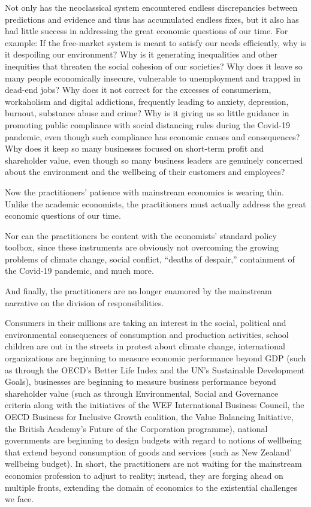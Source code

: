 \documentclass[
]{book}
\begin{document}
Not only has the neoclassical system encountered endless discrepancies between predictions and evidence and thus has accumulated endless fixes, but it also has had little success in addressing the great economic questions of our time. For example: If the free-market system is meant to satisfy our needs efficiently, why is it despoiling our environment? Why is it generating inequalities and other inequities that threaten the social cohesion of our societies? Why does it leave so many people economically insecure, vulnerable to unemployment and trapped in dead-end jobs? Why does it not correct for the excesses of consumerism, workaholism and digital addictions, frequently leading to anxiety, depression, burnout, substance abuse and crime? Why is it giving us so little guidance in promoting public compliance with social distancing rules during the Covid-19 pandemic, even though such compliance has economic causes and consequences? Why does it keep so many businesses focused on short-term profit and shareholder value, even though so many business leaders are genuinely concerned about the environment and the wellbeing of their customers and employees?

Now the practitioners' patience with mainstream economics is wearing thin. Unlike the academic economists, the practitioners must actually address the great economic questions of our time.

Nor can the practitioners be content with the economists' standard policy toolbox, since these instruments are obviously not overcoming the growing problems of climate change, social conflict, ``deaths of despair,'' containment of the Covid-19 pandemic, and much more.

And finally, the practitioners are no longer enamored by the mainstream narrative on the division of responsibilities.

Consumers in their millions are taking an interest in the social, political and environmental consequences of consumption and production activities, school children are out in the streets in protest about climate change, international organizations are beginning to measure economic performance beyond GDP (such as through the OECD's Better Life Index and the UN's Sustainable Development Goals), businesses are beginning to measure business performance beyond shareholder value (such as through Environmental, Social and Governance criteria along with the initiatives of the WEF International Business Council, the OECD Business for Inclusive Growth coalition, the Value Balancing Initiative, the British Academy's Future of the Corporation programme), national governments are beginning to design budgets with regard to notions of wellbeing that extend beyond consumption of goods and services (such as New Zealand' wellbeing budget). In short, the practitioners are not waiting for the mainstream economics profession to adjust to reality; instead, they are forging ahead on multiple fronts, extending the domain of economics to the existential challenges we face.
\end{document}

